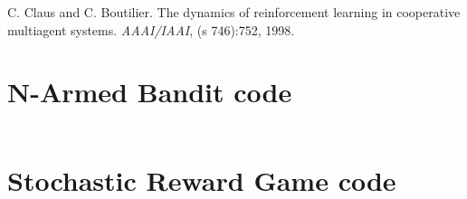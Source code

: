 \documentclass[a4paper]{article}
\begin{document}
\begin{thebibliography}{1}
	 C. Claus and C. Boutilier. The dynamics of 
		reinforcement learning in cooperative multiagent systems. 
		\textit{AAAI/IAAI}, (s 746):752, 1998.
\end{thebibliography}

\appendix
\section{N-Armed Bandit code}
\inputminted{python}{partone.py}

\section{Stochastic Reward Game code}
\inputminted{python}{parttwo.py}
\end{document}
